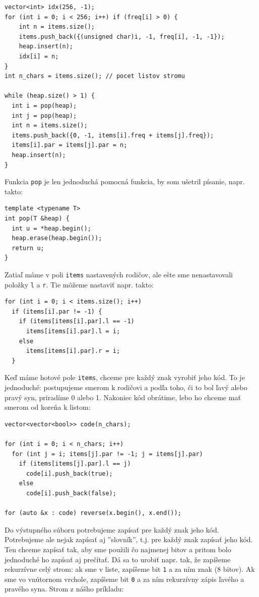 \documentclass[10pt]{article}
\def\ods{\vspace*{10pt}}
\begin{document}
{\begin{lstlisting}
vector<int> idx(256, -1);
for (int i = 0; i < 256; i++) if (freq[i] > 0) {
    int n = items.size();
    items.push_back({(unsigned char)i, -1, freq[i], -1, -1});
    heap.insert(n);
    idx[i] = n;
}
int n_chars = items.size(); // pocet listov stromu

while (heap.size() > 1) {
  int i = pop(heap);
  int j = pop(heap);
  int n = items.size();
  items.push_back({0, -1, items[i].freq + items[j].freq});
  items[i].par = items[j].par = n;
  heap.insert(n);
}
\end{lstlisting}

\ods
Funkcia {\tt pop} je len jednoduchá pomocná funkcia, by som ušetril písanie, napr. takto:

\begin{lstlisting}
template <typename T>
int pop(T &heap) {
  int u = *heap.begin();
  heap.erase(heap.begin());
  return u;
}
\end{lstlisting}

\ods
Zatiaľ máme v poli {\tt items} nastavených rodičov, ale ešte sme nenastavovali
položky {\tt l} a {\tt r}. Tie môžeme nastaviť napr. takto:

\begin{lstlisting}
for (int i = 0; i < items.size(); i++)
  if (items[i].par != -1) {
    if (items[items[i].par].l == -1)
      items[items[i].par].l = i;
    else
      items[items[i].par].r = i;
  }
\end{lstlisting}

\ods
Keď máme hotové pole {\tt items}, chceme pre každý znak vyrobiť jeho kód. To je
jednoduché: postupujeme smerom k rodičovi a podľa toho, či to bol ľavý alebo
pravý syn, priradíme 0 alebo 1. Nakoniec kód obrátime, lebo ho chceme mať smerom
od koreňa k listom:

\begin{lstlisting}
vector<vector<bool>> code(n_chars);

for (int i = 0; i < n_chars; i++)
  for (int j = i; items[j].par != -1; j = items[j].par)
    if (items[items[j].par].l == j)
      code[i].push_back(true);
    else
      code[i].push_back(false);

for (auto &x : code) reverse(x.begin(), x.end());
\end{lstlisting}

\ods
Do výstupného súboru potrebujeme zapísať pre každý znak jeho kód. Potrebujeme ale
nejak zapísať aj ''slovník'', t.j. pre každý znak zapísať jeho kód. Ten chceme zapísať 
tak, aby sme použili čo najmenej bitov a pritom bolo jednoduché ho zapísať aj prečítať.
Dá sa to urobiť napr. tak, že zapíšeme rekurzívne celý strom: ak sme v liste, zapíšeme
bit {\tt 1} a za ním znak (8 bitov). Ak sme vo vnútornom vrchole, zapíšeme bit {\tt 0}
a za ním rekurzívny zápis ľavého a pravého syna. Strom z nášho príkladu:

}
\end{document}
